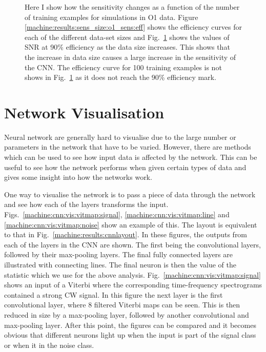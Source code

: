 \begin{figure}[h]
\begin{subfigure}[h]{0.5\textwidth}
		\caption{}
		\label{machine:results:sens_size:o1_sens:train}
	\end{subfigure}
	\caption[Sensitivity with size of data set for O1 simulations.]{Here I show how the sensitivity changes as a function of the number of training examples for simulations in O1 data. Figure \ref{machine:results:sens_size:o1_sens:eff} shows the efficiency curves for each of the different data-set sizes and Fig.~\ref{machine:results:sens_size:o1_sens:train} shows the values of \gls{SNR} at 90\% efficiency as the data size increases. This shows that the increase in data size causes a large increase in the sensitivity of the \gls{CNN}. The efficiency curve for 100 training examples is not shows in Fig.~\ref{machine:results:sens_size:o1_sens:train} as it does not reach the 90\% efficiency mark.}
	\label{machine:results:sens_size:o1_sens}
\end{figure}



\section{\label{cnn:networkvis}Network Visualisation}

Neural network are generally hard to visualise due to the large number or parameters in the network that have to be varied.
However, there are methods which can be used to see how input data is affected by the network.
This can be useful to see how the network performs when given certain types of data and gives some insight into how the networks work.

One way to visualise the network is to pass a piece of data through the network and see how each of the layers transforms the input.
Figs.~\ref{machine:cnn:vis:vitmap:signal}, \ref{machine:cnn:vis:vitmap:line} and \ref{machine:cnn:vis:vitmap:noise} show an example of this.
The layout is equivalent to that in Fig.~\ref{machine:results:cnnlayout}.
In these figures, the outputs from each of the layers in the \gls{CNN} are shown. The first being the convolutional layers, followed by their max-pooling layers. 
The final fully connected layers are illustrated with connecting lines.
The final neuron is then the value of the statistic which we use for the above analysis.
Fig.~\ref{machine:cnn:vis:vitmap:signal} shows an input of a Viterbi where the corresponding time-frequency spectrograms contained a strong \gls{CW} signal.
In this figure the next layer is the first convolutional layer, where 8 filtered Viterbi maps can be seen. 
This is then reduced in size by a max-pooling layer, followed by another convolutional and max-pooling layer.
After this point, the figures can be compared and it becomes obvious that different neurons light up when the input is part of the signal class or when it in the noise class.


